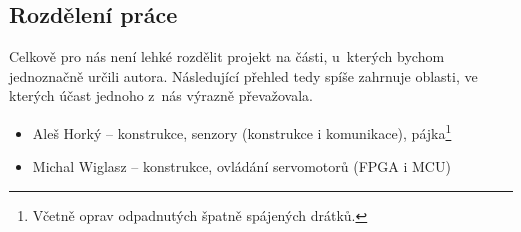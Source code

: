 \subsection{Rozdělení práce}

Celkově pro nás není lehké rozdělit projekt na části, u~kterých bychom jednoznačně určili autora. Následující přehled tedy spíše zahrnuje oblasti, ve kterých účast jednoho z~nás výrazně převažovala.

\begin{itemize}
  \item Aleš Horký -- konstrukce, senzory (konstrukce i komunikace), pájka\footnote{Včetně oprav odpadnutých špatně spájených drátků.}
  \item Michal Wiglasz -- konstrukce, ovládání servomotorů (FPGA i MCU)
\end{itemize}

\newpage




